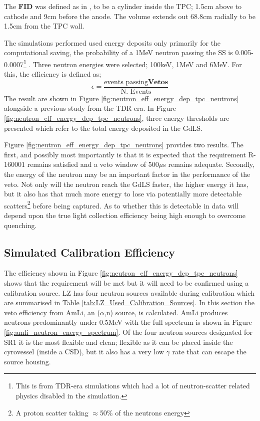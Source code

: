 \par
The \textbf{FID} was defined as in \cite{LZ_TechnicalDesignReview_ref}, to be a cylinder inside the TPC; 1.5cm above to cathode and 9cm before the anode.
The volume extends out 68.8cm radially to be 1.5cm from the TPC wall.

\par
The simulations performed used energy deposits only primarily for the computational saving, the probability of a 1MeV neutron passing the SS is 0.005-0.0007\footnote{This is from TDR-era simulations which had a lot of neutron-scatter related physics disabled in the simulation.} \cite{sallyshaw_thesis_ref}.
Three neutron energies were selected; 100keV, 1MeV and 6MeV.
For this, the efficiency is defined as;
\begin{equation}
    \epsilon = \frac{\text{events passing}\mathbf{Vetos}}{\text{N. Events}}
    \label{eq:reduced_neutron_efficiency}
\end{equation}
The result are shown in Figure \ref{fig:neutron_eff_energy_dep_tpc_neutrons} alongside a previous study from the TDR-era.
In Figure \ref{fig:neutron_eff_energy_dep_tpc_neutrons}, three energy thresholds are presented which refer to the total energy deposited in the GdLS.



\par
Figure \ref{fig:neutron_eff_energy_dep_tpc_neutrons} provides two results.
The first, and possibly most importantly is that it is expected that the requirement R-160001 remains satisfied and a veto window of 500$\mu$s remains adequate.
Secondly, the energy of the neutron may be an important factor in the performance of the veto.
Not only will the neutron reach the GdLS faster, the higher energy it has, but it also has that much more energy to lose via potentially more detectable scatters\footnote{A proton scatter taking $\approx$50\% of the neutrons energy} before being captured.
As to whether this is detectable in data will depend upon the true light collection efficiency being high enough to overcome quenching.

\subsection{Simulated Calibration Efficiency}
\par
The efficiency shown in Figure \ref{fig:neutron_eff_energy_dep_tpc_neutrons} shows that the requirement will be met but it will need to be confirmed using a calibration source.
LZ has four neutron sources available during calibration which are summarised in Table \ref{tab:LZ_Used_Calibration_Sources}.
In this section the veto efficiency from AmLi, an ($\alpha$,n) source, is calculated.
AmLi produces neutrons predominantly under 0.5MeV with the full spectrum is shown in Figure \ref{fig:amli_neutron_energy_spectrum}.
Of the four neutron sources designated for SR1 it is the most flexible and clean; flexible as it can be placed inside the cyrovessel (inside a CSD), but it also has a very low $\gamma$ rate that can escape the source housing.

